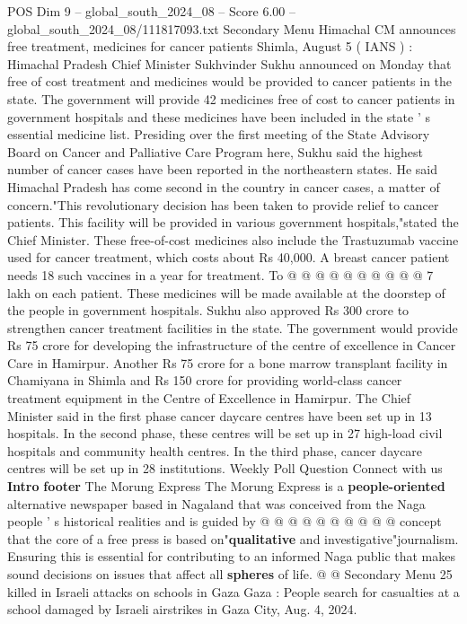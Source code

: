 \begin{textsample}{POS Dim 9 – global\_south\_2024\_08 – Score 6.00 – global\_south\_2024\_08/111817093.txt}  \label{ex:f9_pos_113}
Secondary Menu Himachal CM announces free treatment, medicines for cancer patients Shimla, August 5 ( IANS ) : Himachal Pradesh Chief Minister Sukhvinder Sukhu announced on Monday that free of cost treatment and medicines would be provided to cancer patients in the state.
The government will provide 42 medicines free of cost to cancer patients in government hospitals and these medicines have been included in the state ' s essential medicine list.
Presiding over the first meeting of the State Advisory Board on Cancer and Palliative Care Program here, Sukhu said the highest number of cancer cases have been reported in the northeastern states.
He said Himachal Pradesh has come second in the country in cancer cases, a matter of concern."This revolutionary decision has been taken to provide relief to cancer patients.
This facility will be provided in various government hospitals,"stated the Chief Minister.
These free-of-cost medicines also include the Trastuzumab vaccine used for cancer treatment, which costs about Rs 40,000.
A breast cancer patient needs 18 such vaccines in a year for treatment.
To @ @ @ @ @ @ @ @ @ @ 7 lakh on each patient.
These medicines will be made available at the doorstep of the people in government hospitals.
Sukhu also approved Rs 300 crore to strengthen cancer treatment facilities in the state.
The government would provide Rs 75 crore for developing the infrastructure of the centre of excellence in Cancer Care in Hamirpur.
Another Rs 75 crore for a bone marrow transplant facility in Chamiyana in Shimla and Rs 150 crore for providing world-class cancer treatment equipment in the Centre of Excellence in Hamirpur.
The Chief Minister said in the first phase cancer daycare centres have been set up in 13 hospitals.
In the second phase, these centres will be set up in 27 high-load civil hospitals and community health centres.
In the third phase, cancer daycare centres will be set up in 28 institutions.
Weekly Poll Question Connect with us \textbf{Intro} \textbf{footer} The Morung Express The Morung Express is a \textbf{people-oriented} alternative newspaper based in Nagaland that was conceived from the Naga people ' s historical realities and is guided by @ @ @ @ @ @ @ @ @ @ concept that the core of a free press is based on"\textbf{qualitative} and investigative"journalism.
Ensuring this is essential for contributing to an informed Naga public that makes sound decisions on issues that affect all \textbf{spheres} of life. @ @ Secondary Menu 25 killed in Israeli attacks on schools in Gaza Gaza : People search for casualties at a school damaged by Israeli airstrikes in Gaza City, Aug. 4, 2024.

\end{textsample}
